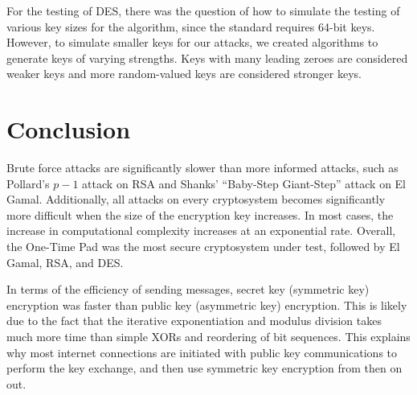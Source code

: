 \documentclass[12pt]{report}
\begin{document}
For the testing of DES, there was the question of how to simulate the testing of various key sizes for the algorithm, since the standard requires 64-bit keys.
However, to simulate smaller keys for our attacks, we created algorithms to generate keys of varying strengths. Keys with many leading zeroes are considered weaker
keys and more random-valued keys are considered stronger keys.

\section{Conclusion}
Brute force attacks are significantly slower than more informed attacks, such as Pollard's $p-1$ attack on RSA and Shanks' ``Baby-Step Giant-Step'' attack on El
Gamal. Additionally, all attacks on every cryptosystem becomes significantly more difficult when the size of the encryption key increases. In most cases, the
increase in computational complexity increases at an exponential rate. Overall, the One-Time Pad was the most secure cryptosystem under test, followed by El Gamal,
RSA, and DES.

In terms of the efficiency of sending messages, secret key (symmetric key) encryption was faster than public key (asymmetric key) encryption. This is likely due to
the fact that the iterative exponentiation and modulus division takes much more time than simple XORs and reordering of bit sequences. This explains why most
internet connections are initiated with public key communications to perform the key exchange, and then use symmetric key encryption from then on out.

\newpage
\end{document}
